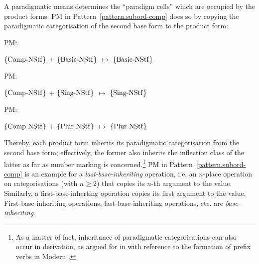 \documentclass[output=paper
  ,nobabel
  ,draftmode
  ,colorlinks, citecolor=brown
]{langscibook}
\begin{document}
\noindent
A paradigmatic means determines the ``paradigm cells'' which
are occupied by the product forms. PM in Pattern \ref{pattern.subord-comp} does so by copying the paradigmatic
categorisation of the second base form to the product form: \begin{exe}
\ex \begin{xlist}
\ex \raggedright
\begin{labeledlist}{PM:}
\item[PM:] \raggedright $\left\{\smash{\operatorname{Comp-NStf}}\right\}$ $+$ $\left\{\smash{\operatorname{Basic-NStf}}\right\}$ $↦$ $\left\{\smash{\operatorname{Basic-NStf}}\right\}$
\end{labeledlist}
\ex \raggedright
\begin{labeledlist}{PM:}
\item[PM:] \raggedright $\left\{\smash{\operatorname{Comp-NStf}}\right\}$ $+$ $\left\{\smash{\operatorname{Sing-NStf}}\right\}$ $↦$ $\left\{\smash{\operatorname{Sing-NStf}}\right\}$
\end{labeledlist}
\ex \raggedright
\begin{labeledlist}{PM:}
\item[PM:] \raggedright $\left\{\smash{\operatorname{Comp-NStf}}\right\}$ $+$ $\left\{\smash{\operatorname{Plur-NStf}}\right\}$ $↦$ $\left\{\smash{\operatorname{Plur-NStf}}\right\}$
\end{labeledlist}
\end{xlist}
\end{exe} 
Thereby, each product form inherits its paradigmatic
categorisation from the second base form; effectively, the former also inherits
the inflection class of the latter as far as number marking is
concerned.\footnote{As a matter of fact, inheritance of paradigmatic categorisations
can also occur in derivation, as argued for in \citet[367–368]{nolda:2019:wortbildung:flexion} with reference to the
formation of prefix verbs in Modern .} PM in Pattern \ref{pattern.subord-comp} is an example for a
\emph{last-base-inheriting} operation, i.e. an $n$-place operation on categorisations (with $n≥2$) that copies its $n$-th argument to the value. Similarly, a first-base-inherting operation
copies its first argument to the value. First-base-inheriting operations,
last-base-inheriting operations, etc. are \emph{base-inheriting}.
\end{document}
